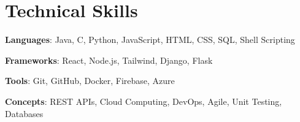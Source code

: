 
\section{Technical Skills}
\begin{itemize}[leftmargin=0.15in, label={}, itemsep=0pt, parsep=0pt]
    \small{
    \item \textbf{Languages}: Java, C, Python, JavaScript, HTML, CSS, SQL, Shell Scripting  
    \item \textbf{Frameworks}: React, Node.js, Tailwind, Django, Flask  
    \item \textbf{Tools}: Git, GitHub, Docker, Firebase, Azure
    \item \textbf{Concepts}: REST APIs, Cloud Computing, DevOps, Agile, Unit Testing, Databases  
    }
\end{itemize}

